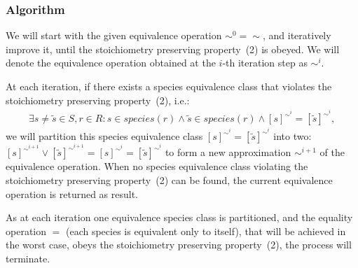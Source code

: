 \documentclass[10pt]{bmc_article}
\newenvironment{bmcformat}{\baselineskip20pt\sloppy\setboolean{publ}{false}}{\baselineskip20pt\sloppy}
\begin{document}
\begin{bmcformat}
\subsubsection*{Algorithm}
We will start with the given equivalence operation $\sim^0 = \sim$, and iteratively improve it, until the stoichiometry preserving property~(2) is obeyed. We will denote the equivalence operation obtained at the $i$-th iteration step as $\sim^i$.

At each iteration, if there exists a species equivalence class that violates the stoichiometry preserving property~(2), i.e.:
\begin{align*}
\exists s \neq \tilde{s} \in S, r \in R: s \in species(r) \land \tilde{s} \in species(r) \land  [s]^{{\sim}^i} = [\tilde{s}]^{{\sim}^i},
\end{align*}
we will partition this species equivalence class $[s]^{{\sim}^i} = [\tilde{s}]^{{\sim}^i}$ into two: $[s]^{{\sim}^{i+1}}  \vee [\tilde{s}]^{{\sim}^{i+1}}  = [s]^{{\sim}^i} = [\tilde{s}]^{{\sim}^i} $ to form a new approximation ${\sim}^{i+1}$ of the equivalence operation. When no species equivalence class violating the stoichiometry preserving property~(2) can be found, the current equivalence operation is returned as result.

As at each iteration one equivalence species class is partitioned, and the equality operation $=$ (each species is equivalent only to itself), that will be achieved in the worst case, obeys the stoichiometry preserving property~(2), the process will terminate. \\



\end{bmcformat}
\end{document}
